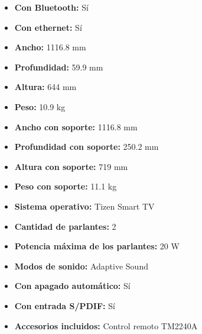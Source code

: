 \documentclass{article}
\begin{document}
\begin{adjustwidth}{2em}{}
\begin{itemize}
\begin{itemize}
    \item \textbf {Con Bluetooth:} Sí
    \item \textbf {Con ethernet:} Sí
    \item \textbf {Ancho:} 1116.8 mm
    \item \textbf {Profundidad:} 59.9 mm
    \item \textbf {Altura:} 644 mm
    \item \textbf {Peso:} 10.9 kg
    \item \textbf {Ancho con soporte:} 1116.8 mm
    \item \textbf {Profundidad con soporte:} 250.2 mm
    \item \textbf {Altura con soporte:} 719 mm
    \item \textbf {Peso con soporte:} 11.1 kg
    \item \textbf {Sistema operativo:} Tizen Smart TV
    \item \textbf {Cantidad de parlantes:} 2
    \item \textbf {Potencia máxima de los parlantes:} 20 W
    \item \textbf {Modos de sonido:} Adaptive Sound
    \item \textbf {Con apagado automático:} Sí
    \item \textbf {Con entrada S/PDIF:} Sí
    \item \textbf {Accesorios incluidos:} Control remoto TM2240A
    \end{itemize}
\end{itemize}

\vspace{1\baselineskip} %
\end{adjustwidth}
\end{document}
